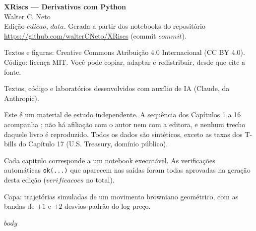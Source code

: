 \documentclass[10pt,twoside,openright]{book}
\numberwithin{equation}{chapter}
\theoremstyle{livro}
\theoremstyle{livrodef}
\begin{document}
{\small\noindent
\textbf{XRiscs --- Derivativos com Python}\\
Walter C. Neto\\
Edição $edicao$, $data$. Gerada a partir dos notebooks do repositório
\url{https://github.com/walterCNeto/XRiscs} (commit $commit$).\par\medskip
\noindent Textos e figuras: Creative Commons Atribuição 4.0 Internacional (CC BY 4.0).
Código: licença MIT. Você pode copiar, adaptar e redistribuir, desde que cite a fonte.\par\medskip
\noindent Textos, código e laboratórios desenvolvidos com auxílio de IA (Claude, da Anthropic).\par\medskip
\noindent Este é um material de estudo independente. A sequência dos Capítulos 1 a 16 acompanha
\citet{hilpisch2015}; não há afiliação com o autor nem com a editora, e nenhum trecho daquele livro é reproduzido.
Todos os dados são sintéticos, exceto as taxas dos T-bills do Capítulo 17 (U.S. Treasury, domínio público).\par\medskip
\noindent Cada capítulo corresponde a um notebook executável. As verificações automáticas \texttt{ok(...)}
que aparecem nas saídas foram todas aprovadas na geração desta edição ($verificacoes$ no total).\par\medskip
\noindent Capa: trajetórias simuladas de um movimento browniano geométrico, com as bandas de \(\pm1\) e \(\pm2\) desvios-padrão do log-preço.\par}
\cleardoublepage
\pagestyle{fancy}
\tableofcontents
\cleardoublepage
$body$
\backmatter
\cleardoublepage
{}
{}
\renewcommand{\bibname}{Referências}
\nocite{*}


\end{document}
